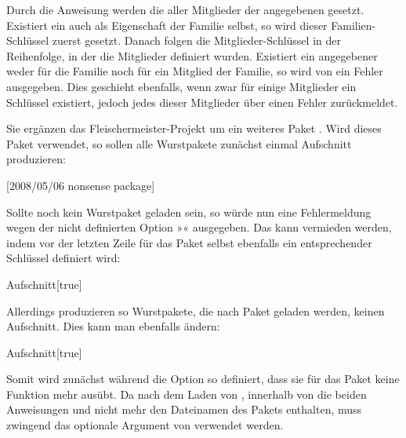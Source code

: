 Durch die Anweisung werden die  aller Mitglieder der
angegebenen  gesetzt. Existiert ein  auch als
Eigenschaft der Familie selbst, so wird dieser Familien-Schlüssel zuerst
gesetzt. Danach folgen die Mitglieder-Schlüssel in der Reihenfolge, in der die
Mitglieder definiert wurden. Existiert ein angegebener  weder
für die Familie noch für ein Mitglied der Familie, so wird von
 ein Fehler ausgegeben. Dies geschieht ebenfalls, wenn
zwar für einige Mitglieder ein Schlüssel existiert, jedoch jedes dieser
Mitglieder über  einen Fehler
zurückmeldet.
\begin{Example}
  Sie ergänzen das Fleischermeister-Projekt um ein weiteres Paket
  . Wird dieses Paket verwendet, so sollen alle
  Wurstpakete zunächst einmal Aufschnitt produzieren:
\begin{lstcode}
                  [2008/05/06 nonsense package]
  \RequirePackage{scrbase}
  \relax
\end{lstcode}
  Sollte noch kein Wurstpaket geladen sein, so würde nun eine Fehlermeldung
  wegen der nicht definierten Option »« ausgegeben. Das
  kann vermieden werden, indem vor der letzten Zeile für das Paket selbst
  ebenfalls ein entsprechender Schlüssel definiert wird:
\begin{lstcode}
                  {Aufschnitt}[true]{}%
\end{lstcode}
  Allerdings produzieren so Wurstpakete, die nach Paket
   geladen werden, keinen Aufschnitt. Dies kann man
  ebenfalls ändern:
\begin{lstcode}
                  {Aufschnitt}[true]{%
  }%
\end{lstcode}
  Somit wird zunächst während  die Option so
  definiert, dass sie für das Paket  keine Funktion mehr
  ausübt. Da nach dem Laden von , innerhalb von
   die beiden Anweisungen 
  und  nicht mehr den Dateinamen des Pakets enthalten, muss
  zwingend das optionale Argument von 
  verwendet werden.


\end{Example}
